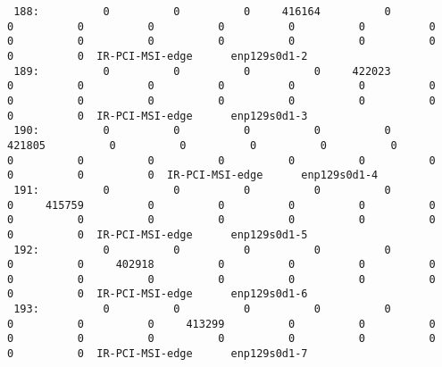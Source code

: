 \begin{lstlisting}
 188:          0          0          0     416164          0          0          0          0          0          0          0          0          0          0          0          0          0          0          0          0          0  IR-PCI-MSI-edge      enp129s0d1-2
 189:          0          0          0          0     422023          0          0          0          0          0          0          0          0          0          0          0          0          0          0          0          0  IR-PCI-MSI-edge      enp129s0d1-3
 190:          0          0          0          0          0     421805          0          0          0          0          0          0          0          0          0          0          0          0          0          0          0  IR-PCI-MSI-edge      enp129s0d1-4
 191:          0          0          0          0          0          0     415759          0          0          0          0          0          0          0          0          0          0          0          0          0          0  IR-PCI-MSI-edge      enp129s0d1-5
 192:          0          0          0          0          0          0          0     402918          0          0          0          0          0          0          0          0          0          0          0          0          0  IR-PCI-MSI-edge      enp129s0d1-6
 193:          0          0          0          0          0          0          0          0     413299          0          0          0          0          0          0          0          0          0          0          0          0  IR-PCI-MSI-edge      enp129s0d1-7
\end{lstlisting}


